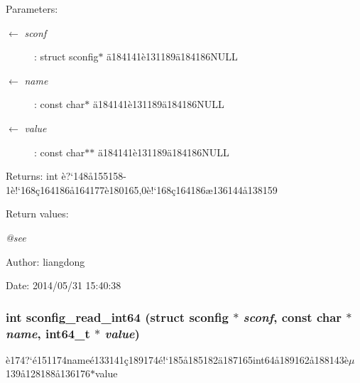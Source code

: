 \begin{Desc}
\item[Parameters:]
\begin{description}
\item[\mbox{$\leftarrow$} {\em sconf}]: struct sconfig$\ast$ \"{a}184141\`{e}131189\"{a}184186NULL \item[\mbox{$\leftarrow$} {\em name}]: const char$\ast$ \"{a}184141\`{e}131189\"{a}184186NULL \item[\mbox{$\leftarrow$} {\em value}]: const char$\ast$$\ast$ \"{a}184141\`{e}131189\"{a}184186NULL \end{description}
\end{Desc}
\begin{Desc}
\item[Returns:]int \`{e}?`148\aa{}155158-1\`{e}!`168\c{c}164186\aa{}164177\`{e}180165,0\`{e}!`168\c{c}164186\ae{}136144\aa{}138159 \end{Desc}
\begin{Desc}
\item[Return values:]
\begin{description}
\item[{\em @see}]\end{description}
\end{Desc}
\begin{Desc}
\item[Author:]liangdong \end{Desc}
\begin{Desc}
\item[Date:]2014/05/31 15:40:38 \end{Desc}
\subsubsection{\setlength{\rightskip}{0pt plus 5cm}int sconfig\_\-read\_\-int64 (struct sconfig $\ast$ {\em sconf}, const char $\ast$ {\em name}, int64\_\-t $\ast$ {\em value})}\label{sconfig_8h_a6}


\`{e}174?`\'{e}151174name\'{e}133141\c{c}189174\'{e}!`185\aa{}185182\"{a}187165int64\aa{}189162\aa{}188143\`{e}$\mu$139\aa{}128188\aa{}136176$\ast$value 

